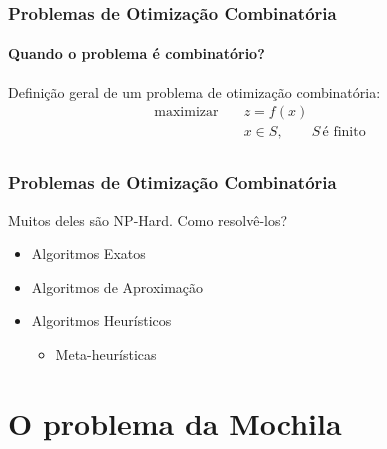\documentclass[10pt,fleqn]{beamer}
\newcommand{\litem}[1]{
  \item{#1 \vspace{9pt}}
}
\begin{document}
\begin{frame}
  \frametitle{Problemas de Otimização Combinatória}
  \framesubtitle{Quando o problema é combinatório?}
  Definição geral de um problema de otimização combinatória:
  \begin{align}
    \textrm{maximizar}
      \quad & z = f(x) \nonumber \\
  	  \quad & x \in S \nonumber, \qquad S \, \textrm{é finito} \\
	  \nonumber
  \end{align}
\end{frame}



\begin{frame}
  \frametitle{Problemas de Otimização Combinatória}
  Muitos deles são NP-Hard. Como resolvê-los?
  \vspace{10pt}
  \begin{itemize}
    \litem{Algoritmos Exatos}
    \litem{Algoritmos de Aproximação}
    \litem{Algoritmos Heurísticos}
	\begin{itemize}
	  \item{Meta-heurísticas}
	\end{itemize}
  \end{itemize}
\end{frame}

\section{O problema da Mochila}
\end{document}
